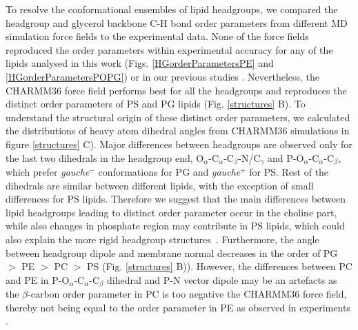 \documentclass[aps,prl,superscriptaddress,twocolumn]{revtex4}
\begin{document}
To resolve the conformational ensembles of lipid headgroups,
we compared the headgroup and glycerol backbone C-H bond order parameters
from different MD simulation force fields to the experimental data. 
None of the force fields reproduced the order parameters
within experimental accuracy for any of the lipids analysed in this work
(Figs. \ref{HGorderParametersPE} and \ref{HGorderParametersPOPG}) or in our previous studies \cite{botan15,antila19}.
Nevertheless, the CHARMM36 force field performs best for all the headgroups and
reproduces the distinct order parameters of PS and PG lipids (Fig. \ref{structures} B).
To understand the structural origin of these distinct order parameters,
we calculated the distributions of heavy atom dihedral angles from CHARMM36 simulations in figure \ref{structures} C).
Major differences between headgroups are observed only for the last two dihedrals
in the headgroup end,  O$_\alpha$-C$_\alpha$-C$_\beta$-N/C$_\gamma$ and P-O$_\alpha$-C$_\alpha$-C$_\beta$,
which prefer {\it gauche$^-$} conformations for PG and {\it gauche$^+$} for PS.
Rest of the dihedrals are similar between different lipids, with the exception of
small differences for PS lipids. Therefore we suggest that the main differences between
lipid headgroups leading to distinct order parameter occur in the choline part, while
also changes in phosphate region may contribute in PS lipids, which could also
explain the more rigid headgroup structures~\cite{browning80,buldt81}.
Furthermore, the angle between headgroup dipole and membrane normal
decreases in the order of PG $>$ PE  $>$ PC  $>$ PS (Fig. \ref{structures} B)).
However, the differences between PC and PE in P-O$_\alpha$-C$_\alpha$-C$_\beta$ dihedral
and P-N vector dipole may be an artefacts as the $\beta$-carbon order parameter in PC
is too negative the CHARMM36 force field, thereby not being equal to the order parameter
in PE as observed in experiments \cite{botan15}.
\end{document}
